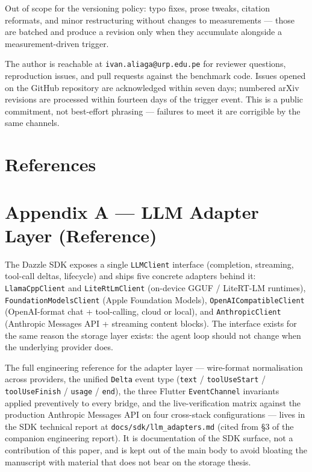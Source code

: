 Out of scope for the versioning policy: typo fixes, prose tweaks, citation
reformats, and minor restructuring without changes to measurements --- those are
batched and produce a revision only when they accumulate alongside a
measurement-driven trigger.

The author is reachable at \texttt{ivan.aliaga@urp.edu.pe} for reviewer
questions, reproduction issues, and pull requests against the benchmark code.
Issues opened on the GitHub repository are acknowledged within seven days;
numbered arXiv revisions are processed within fourteen days of the trigger
event. This is a public commitment, not best-effort phrasing --- failures to
meet it are corrigible by the same channels.

\section{References}\label{references}

\protect{}\label{refs}

\section{Appendix A --- LLM Adapter Layer
(Reference)}\label{appendix-a-llm-adapter-layer-reference}

The Dazzle SDK exposes a single \texttt{LLMClient} interface (completion,
streaming, tool-call deltas, lifecycle) and ships five concrete adapters behind
it: \texttt{LlamaCppClient} and \texttt{LiteRtLmClient} (on-device GGUF /
LiteRT-LM runtimes), \texttt{FoundationModelsClient} (Apple Foundation Models),
\texttt{OpenAICompatibleClient} (OpenAI-format chat + tool-calling, cloud or
local), and \texttt{AnthropicClient} (Anthropic Messages API + streaming content
blocks). The interface exists for the same reason the storage layer exists: the
agent loop should not change when the underlying provider does.

The full engineering reference for the adapter layer --- wire-format
normalisation across providers, the unified \texttt{Delta} event type
(\texttt{text} / \texttt{toolUseStart} / \texttt{toolUseFinish} / \texttt{usage}
/ \texttt{end}), the three Flutter \texttt{EventChannel} invariants applied
preventively to every bridge, and the live-verification matrix against the
production Anthropic Messages API on four cross-stack configurations --- lives
in the SDK technical report at \texttt{docs/sdk/llm\_adapters.md} (cited from §3
of the companion engineering report). It is documentation of the SDK surface,
not a contribution of this paper, and is kept out of the main body to avoid
bloating the manuscript with material that does not bear on the storage thesis.

